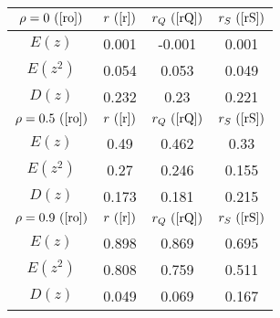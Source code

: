 \begin{tabular}{|c|c|c|c|}
\hline
$\rho = 0~(\ref{ro})$ & $r ~(\ref{r})$ & $r_Q ~(\ref{rQ})$ & $r_S ~(\ref{rS})$\\
\hline
$E(z)$ & 0.001 & -0.001 & 0.001\\
\hline
$E(z^2)$ & 0.054 & 0.053 & 0.049\\
\hline
$D(z)$ & 0.232 & 0.23 & 0.221\\
\hline
$\rho = 0.5~(\ref{ro})$ & $r ~(\ref{r})$ & $r_Q ~(\ref{rQ})$ & $r_S ~(\ref{rS})$\\
\hline
$E(z)$ & 0.49 & 0.462 & 0.33\\
\hline
$E(z^2)$ & 0.27 & 0.246 & 0.155\\
\hline
$D(z)$ & 0.173 & 0.181 & 0.215\\
\hline
$\rho = 0.9~(\ref{ro})$ & $r ~(\ref{r})$ & $r_Q ~(\ref{rQ})$ & $r_S ~(\ref{rS})$\\
\hline
$E(z)$ & 0.898 & 0.869 & 0.695\\
\hline
$E(z^2)$ & 0.808 & 0.759 & 0.511\\
\hline
$D(z)$ & 0.049 & 0.069 & 0.167\\
\hline
\end{tabular}